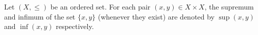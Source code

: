 Let $(X, \leq)$ be an ordered set. For each pair $(x, y) \in X \times X$, the supremum and infimum of the set $\{x, y\}$ (whenever they exist) are denoted by $\sup(x, y)$ and $\inf(x, y)$ respectively.
